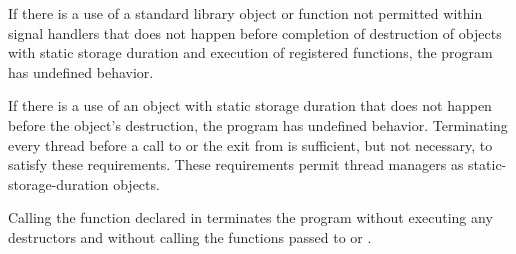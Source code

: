 \pnum
If there is a use of a standard library object or function not permitted within signal
handlers that does not happen before
completion of destruction of objects with static storage duration and execution of
 registered functions, the program has
undefined behavior. \begin{note} If there is a use of an object with static storage
duration that does not happen before the object's destruction, the program has undefined
behavior. Terminating every thread before a call to  or the exit from
 is sufficient, but not necessary, to satisfy these requirements. These
requirements permit thread managers as static-storage-duration objects. \end{note}

\pnum
{}%
%
%
Calling the function  declared in
%
 terminates the program without executing any destructors
and without calling
the functions passed to  or .%
